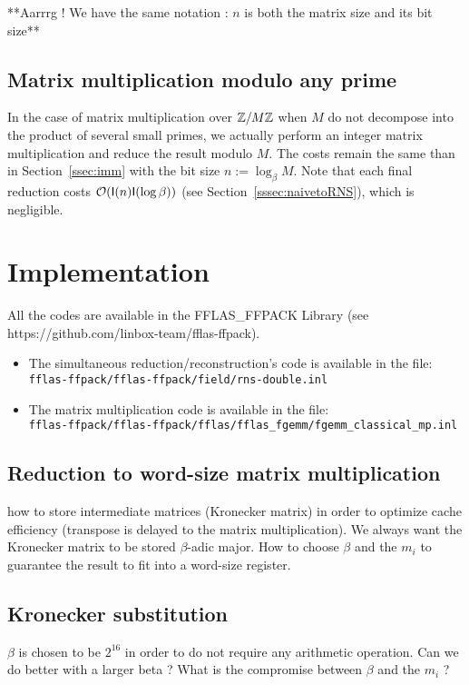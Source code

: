 \documentclass[acmtoms,acmnow]{acmtrans2m}
\def\bigO{{\ensuremath{\mathcal{O}}}}
\newcommand{\assign}{:=}
\begin{document}
**Aarrrg ! We have the same notation : $n$ is both the matrix size and its bit size**

\subsection{Matrix multiplication modulo any prime}

In the case of matrix multiplication over $\mathbb{Z}/M\mathbb{Z}$ when $M$ do not decompose
into the product of several small primes, we actually perform an integer matrix
multiplication and reduce the result modulo $M$. The costs remain the same than
in Section~\ref{ssec:imm} with the bit size $n \assign \log_\beta M$.  Note that
each final reduction costs $\bigO(\I(n) \I(\log \beta))$ (see
Section~\ref{sssec:naivetoRNS}), which is negligible.



\section{Implementation}
{\color{red}
All the codes are available in the FFLAS\_FFPACK Library (see https://github.com/linbox-team/fflas-ffpack).
\begin{itemize}
\item The simultaneous reduction/reconstruction's code is available in the file:\\ \texttt{fflas-ffpack/fflas-ffpack/field/rns-double.inl}
\item The matrix multiplication code is available in the file: \\\texttt{fflas-ffpack/fflas-ffpack/fflas/fflas\_fgemm/fgemm\_classical\_mp.inl}
\end{itemize}
}
\subsection{Reduction to word-size matrix multiplication}
how to store intermediate matrices (Kronecker matrix) in order to optimize cache
efficiency (transpose is delayed to the matrix multiplication). We always want
the Kronecker matrix to be stored $\beta$-adic major.  How to choose $\beta$ and
the $m_i$ to guarantee the result to fit into a word-size register.

\subsection{Kronecker substitution}
$\beta$ is chosen to be $2^{16}$ in order to do not require any arithmetic
operation.  Can we do better with a larger beta ? What is the compromise between
$\beta$ and the $m_i$ ?
\end{document}
